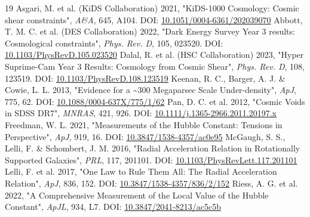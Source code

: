 \documentclass[11pt,a4paper]{article}
\begin{document}
\begin{thebibliography}{19}
 Asgari, M. et al. (KiDS Collaboration) 2021, "KiDS-1000 Cosmology: Cosmic shear constraints", \emph{A\&A}, 645, A104. DOI: \href{https://doi.org/10.1051/0004-6361/202039070}{10.1051/\allowbreak{}0004-6361/\allowbreak{}202039070}
 Abbott, T. M. C. et al. (DES Collaboration) 2022, "Dark Energy Survey Year 3 results: Cosmological constraints", \emph{Phys. Rev. D}, 105, 023520. DOI: \href{https://doi.org/10.1103/PhysRevD.105.023520}{10.1103/\allowbreak{}PhysRevD.105.023520}
 Dalal, R. et al. (HSC Collaboration) 2023, "Hyper Suprime-Cam Year 3 Results: Cosmology from Cosmic Shear", \emph{Phys. Rev. D}, 108, 123519. DOI: \href{https://doi.org/10.1103/PhysRevD.108.123519}{10.1103/\allowbreak{}PhysRevD.108.123519}
 Keenan, R. C., Barger, A. J. \& Cowie, L. L. 2013, "Evidence for a \~{}300 Megaparsec Scale Under-density", \emph{ApJ}, 775, 62. DOI: \href{https://doi.org/10.1088/0004-637X/775/1/62}{10.1088/\allowbreak{}0004-637X/\allowbreak{}775/\allowbreak{}1/\allowbreak{}62}
 Pan, D. C. et al. 2012, "Cosmic Voids in SDSS DR7", \emph{MNRAS}, 421, 926. DOI: \href{https://doi.org/10.1111/j.1365-2966.2011.20197.x}{10.1111/\allowbreak{}j.1365-2966.2011.20197.x}
 Freedman, W. L. 2021, "Measurements of the Hubble Constant: Tensions in Perspective", \emph{ApJ}, 919, 16. DOI: \href{https://doi.org/10.3847/1538-4357/ac0e95}{10.3847/\allowbreak{}1538-4357/\allowbreak{}ac0e95}
 McGaugh, S. S., Lelli, F. \& Schombert, J. M. 2016, "Radial Acceleration Relation in Rotationally Supported Galaxies", \emph{PRL}, 117, 201101. DOI: \href{https://doi.org/10.1103/PhysRevLett.117.201101}{10.1103/\allowbreak{}PhysRevLett.117.201101}
 Lelli, F. et al. 2017, "One Law to Rule Them All: The Radial Acceleration Relation", \emph{ApJ}, 836, 152. DOI: \href{https://doi.org/10.3847/1538-4357/836/2/152}{10.3847/\allowbreak{}1538-4357/\allowbreak{}836/\allowbreak{}2/\allowbreak{}152}
 Riess, A. G. et al. 2022, "A Comprehensive Measurement of the Local Value of the Hubble Constant", \emph{ApJL}, 934, L7. DOI: \href{https://doi.org/10.3847/2041-8213/ac5c5b}{10.3847/\allowbreak{}2041-8213/\allowbreak{}ac5c5b}
\end{thebibliography}
\end{document}

